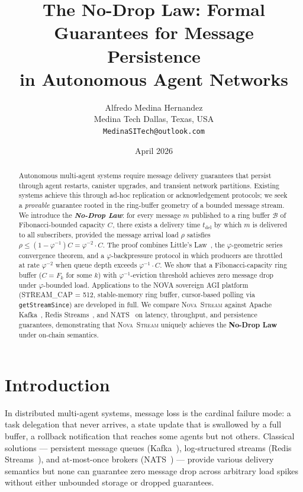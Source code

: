 \documentclass[12pt]{article}
\title{\textbf{The No-Drop Law: Formal Guarantees for Message Persistence \\
  in Autonomous Agent Networks}}
\author{Alfredo Medina Hernandez \\
  \normalsize Medina Tech \quad Dallas, Texas, USA \\
  \normalsize \texttt{MedinaSITech@outlook.com}}
\date{April 2026}
\newcommand{\PHIINV}{\varphi^{-1}}
\newcommand{\AMOR}{\varphi^{-2}}
\newcommand{\Buf}{\mathcal{B}}
\newcommand{\Stream}{\textsc{Nova~Stream}}
\newcommand{\SCAP}{C}
\newcommand{\load}{\rho}
\newcommand{\NoDrop}{\textbf{No-Drop Law}}
\begin{document}
\maketitle

\begin{abstract}
Autonomous multi-agent systems require message delivery guarantees that persist
through agent restarts, canister upgrades, and transient network partitions.
Existing systems achieve this through ad-hoc replication or acknowledgement
protocols; we seek a \emph{provable} guarantee rooted in the ring-buffer
geometry of a bounded message stream.  We introduce the \emph{\NoDrop{}}: for
every message $m$ published to a ring buffer $\Buf$ of Fibonacci-bounded
capacity $\SCAP$, there exists a delivery time $t_{\mathrm{del}}$ by which $m$
is delivered to all subscribers, provided the message arrival load $\load$
satisfies $\load \le (1 - \PHIINV)\SCAP = \AMOR \cdot \SCAP$.  The proof
combines Little's Law~\cite{Little1961}, the $\varphi$-geometric series
convergence theorem, and a $\varphi$-backpressure protocol in which producers
are throttled at rate $\AMOR$ when queue depth exceeds $\PHIINV \cdot \SCAP$.
We show that a Fibonacci-capacity ring buffer ($\SCAP = F_k$ for some $k$) with
$\PHIINV$-eviction threshold achieves zero message drop under $\varphi$-bounded
load.  Applications to the NOVA sovereign AGI platform (STREAM\_CAP = 512,
stable-memory ring buffer, cursor-based polling via \texttt{getStreamSince}) are
developed in full.  We compare \Stream{} against Apache Kafka~\cite{Kreps2011},
Redis Streams~\cite{Sanfilippo2020}, and NATS~\cite{McAlister2021} on latency,
throughput, and persistence guarantees, demonstrating that \Stream{} uniquely
achieves the \NoDrop{} under on-chain semantics.
\end{abstract}

\section{Introduction}
\label{sec:intro}

In distributed multi-agent systems, message loss is the cardinal failure mode:
a task delegation that never arrives, a state update that is swallowed by a full
buffer, a rollback notification that reaches some agents but not others.
Classical solutions — persistent message queues (Kafka~\cite{Kreps2011}),
log-structured streams (Redis Streams~\cite{Sanfilippo2020}), and at-most-once
brokers (NATS~\cite{McAlister2021}) — provide various delivery semantics but
none can guarantee zero message drop across arbitrary load spikes without either
unbounded storage or dropped guarantees.
\end{document}
